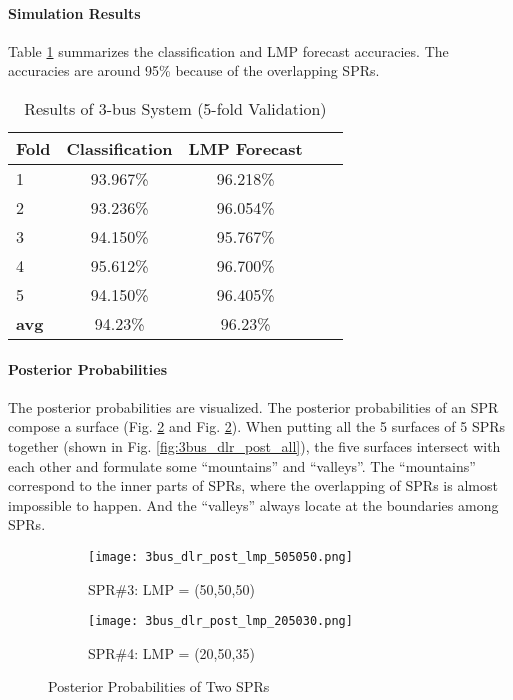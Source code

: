 \documentclass[letterpaper, 11pt]{article}
\theoremstyle{plain}
\theoremstyle{definition}
\begin{document}
\paragraph{Simulation Results} \label{par:classification}
Table \ref{tab:classification_accuracy_3bus} summarizes the classification and LMP forecast accuracies. The accuracies are around 95\% because of the overlapping SPRs.


\begin{table}[htbp]
  \caption{Results of 3-bus System (5-fold Validation)}
  \label{tab:classification_accuracy_3bus}
  \centering

  \begin{tabular}{l|cccc}
  \hline

  \hline
  \textbf{Fold} & \textbf{Classification} & \textbf{LMP Forecast}  \\
  \hline
  1 & 93.967\% & 96.218\% \\
  2 & 93.236\% & 96.054\% \\
  3 & 94.150\% & 95.767\%\\
  4 & 95.612\% & 96.700\%\\
  5 & 94.150\% & 96.405\%\\
  \hline
  \textbf{avg} & 94.23\% & 96.23\%\\
  \hline

  \hline
  \end{tabular}
\end{table}



\paragraph{Posterior Probabilities} \label{par:posterior_probability_estimation}
The posterior probabilities are visualized. 
The posterior probabilities of an SPR compose a surface (Fig. \ref{fig:3bus_dlr_post_lmp_205030} and Fig. \ref{fig:3bus_dlr_post_lmp_205030}). When putting all the 5 surfaces of 5 SPRs together (shown in Fig. \ref{fig:3bus_dlr_post_all}), the five surfaces intersect with each other and formulate some ``mountains'' and ``valleys''. The ``mountains'' correspond to the inner parts of SPRs, where the overlapping of SPRs is almost impossible to happen. And the  ``valleys'' always locate at the boundaries among SPRs.

\begin{figure}[htbp]
  \centering
  \begin{subfigure}[t]{0.49\linewidth}
  \centering
  \texttt{[image: 3bus\_dlr\_post\_lmp\_505050.png]}
  \caption{SPR\#3: LMP = (50,50,50)}
  \label{fig:3bus_dlr_post_lmp_505050}
  \end{subfigure}
  \begin{subfigure}[t]{0.49\linewidth}
  \centering
  \texttt{[image: 3bus\_dlr\_post\_lmp\_205030.png]}
  \caption{SPR\#4: LMP = (20,50,35)}
  \label{fig:3bus_dlr_post_lmp_205030}
  \end{subfigure} 
  \caption{Posterior Probabilities of Two SPRs}  
  \label{fig:visualize_posteriors} 
\end{figure}
\end{document}
